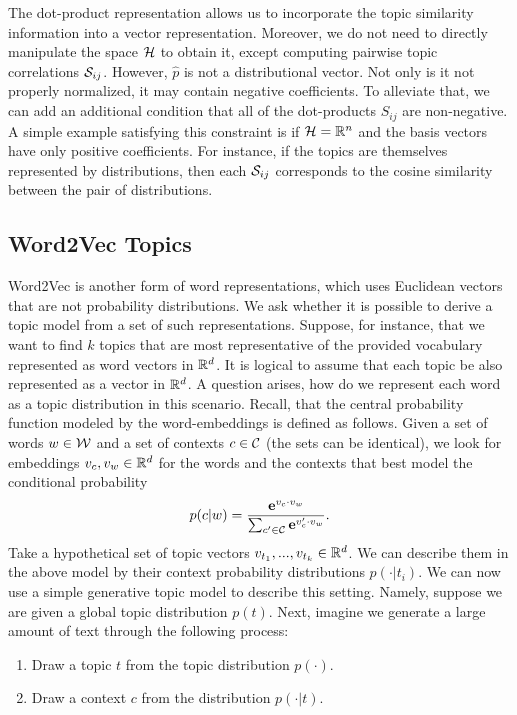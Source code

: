 The dot-product representation allows us to incorporate the topic
similarity information into a vector representation. Moreover, we do
not need to directly manipulate the space ${\mathcal H}$ to obtain it, except
computing pairwise topic correlations ${\mathcal S}_{ij}$. However,
$\widehat{p}$ is not a distributional vector. Not only is it not
properly normalized, it may contain negative coefficients. To
alleviate that, we can add an additional condition that all of the
dot-products $S_{ij}$ are non-negative. A simple example satisfying
this constraint is if ${\mathcal H}={\mathbb R}^n$ and the basis vectors have only
positive coefficients. For instance, if the topics are
themselves represented by distributions, then each ${\mathcal S}_{ij}$
corresponds to the cosine similarity between the pair of
distributions.

\subsection{Word2Vec Topics}

Word2Vec is another form of word representations, which uses Euclidean
vectors that are not probability distributions. We ask whether
it is possible to derive a topic model from a set of such
representations. Suppose, for instance, that we want to find $k$
topics that are most representative of the provided vocabulary
represented as word vectors in ${\mathbb R}^d$. It is logical to assume that
each topic be also represented as a vector in ${\mathbb R}^d$. A question
arises, how do we represent each word as a topic distribution in this
scenario. Recall, that the central probability function modeled by the
word-embeddings is defined as follows. Given a set of words $w\in{\mathcal W}$
and a set of contexts $c\in{\mathcal C}$ (the sets can be identical), we look
for embeddings $v_c,v_w\in{\mathbb R}^d$ for the words and the contexts
that best model the conditional probability  
\[p(c|w) = \frac{\operatorname{\mathbf{e}}^{v_c\cdot v_w}}{\sum_{c'\in{\mathcal C}}\operatorname{\mathbf{e}}^{v_c'\cdot v_w}}.\]
Take a hypothetical set of topic vectors $v_{t_1},...,v_{t_k}\in{\mathbb R}^d$. We can
describe them in the above model by their context probability
distributions $p(\cdot|t_i)$. We can now use a simple generative topic
model to describe this setting. Namely, suppose we are given a global
topic distribution $p(t)$. Next, imagine we generate a large amount of
text through the following process:
\begin{enumerate}
\item Draw a topic $t$ from the topic distribution $p(\cdot)$.
\item Draw a context $c$ from the distribution $p(\cdot|t)$.
\end{enumerate}

